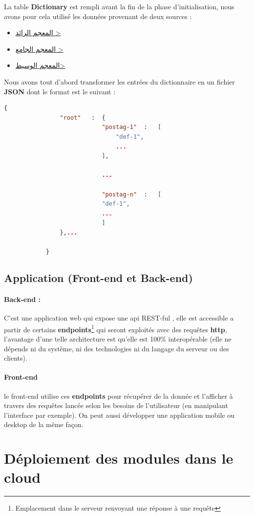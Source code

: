 \documentclass[]{report}
\begin{document}
			\par
			La table \textbf{Dictionary} est rempli avant la fin de la phase d'initialisation, nous avons pour cela utilisé les données provenant de deux sources : 
			\begin{itemize}
				\item \href{http://waqfeya.com/book.php?bid=6116}{\<المعجم الرائد >}
				\item \href{https://www.almaany.com/ar/dict/ar-ar/}{\<المعجم الجامع >}
				\item \href{http://waqfeya.com/book.php?bid=210}{\<المعجم الوسيط> }
			\end{itemize}
			Nous avons tout d'abord transformer les entrées du dictionnaire en un fichier \textbf{JSON} dont le format est le suivant : 
			\begin{lstlisting}[language=json,firstnumber=1]
			{
				"root"	 : 	{
							"postag-1"	:	[
								"def-1",
								...
							],
							
							...
							
							"postag-n"	:	[
							"def-1",
							...
							]
				},...
						
			}
			\end{lstlisting}
		\subsection{Application (Front-end et Back-end)}	
			\paragraph{Back-end :}
			C'est une application web qui expose une api REST-ful , elle est accessible a partir de certains \textbf{endpoints}\footnote{Emplacement dans le serveur renvoyant une réponse à une requête } qui seront exploités avec
			des requêtes \textbf{http}, l'avantage d'une telle architecture est qu'elle est 100\% interopérable 
			(elle ne dépends ni du système, ni des technologies ni du langage du serveur ou des clients).
			\paragraph{Front-end}
			le front-end utilise ces \textbf{endpoints} pour récupérer de la donnée et l'afficher à travers des requêtes lancée selon les besoins de l'utilisateur (en manipulant l'interface par exemple).
			On peut aussi développer une application mobile ou desktop de la même façon.   	
	\section{Déploiement des modules dans le cloud}
\end{document}
